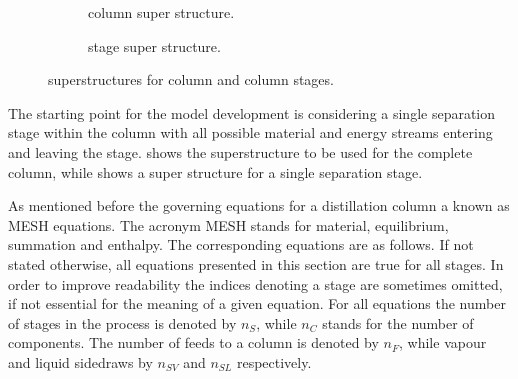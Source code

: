         \begin{figure}
            \centering
            \begin{subfigure}{0.3\textwidth}
                \centering
                
                \caption{column super structure.}
                \label{fig:col_super}
            \end{subfigure}
            \qquad
            \begin{subfigure}{0.6\textwidth}
                \centering
                
                \caption{stage super structure.}
                \label{fig:col_stage_super}
            \end{subfigure}
            \caption{superstructures for column and column stages.}
        \end{figure}

        The starting point for the model development  is considering a single separation stage within the
        column with all possible material and energy streams entering and leaving the stage.  
        shows the superstructure to be used for the complete column, while  shows a super
        structure for a single separation stage.

        As mentioned before the governing equations for a distillation column a known as MESH equations. The acronym
        MESH stands for material, equilibrium, summation and enthalpy. The corresponding equations are as follows.
        If not stated otherwise, all equations presented in this section are true for all stages. In order
        to improve readability the indices denoting a stage are sometimes omitted, if not essential for the meaning of
        a given equation. For all equations the number of stages in the process is denoted by $n_S$, while $n_C$
        stands for the number of components. The number of feeds to a column is denoted by $n_F$, while vapour and 
        liquid sidedraws by $n_{SV}$ and $n_{SL}$ respectively.  

